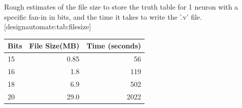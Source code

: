 \newpage




\newpage
 
\begin{table}
    \begin{sidecaption}{%
        Rough estimates of the file size to store the truth table for 1 neuron with a specific fan-in in bits, and the time it takes to write the '.v' file.
    }[designautomate:tab:filesize]
\begin{threeparttable}
\begin{tabular}{lrr}
\hline
Bits & File Size(MB) & Time (seconds) \\ \hline
15   & 0.85          & 56      \\
16   & 1.8           & 119     \\
18   & 6.9           & 502     \\
20   & 29.0          & 2022    \\ \hline
\end{tabular}
\end{threeparttable}
\end{sidecaption}
\end{table}

